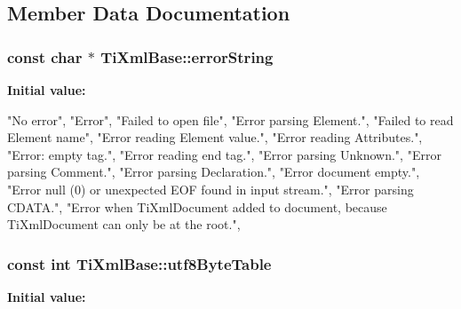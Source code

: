 \subsection{\-Member \-Data \-Documentation}
\hypertarget{class_ti_xml_base_a7ac8feec4100e446b3d78e1ac0659700}{
\subsubsection[{error\-String}]{\setlength{\rightskip}{0pt plus 5cm}const char $\ast$ \-Ti\-Xml\-Base\-::error\-String}}
\label{class_ti_xml_base_a7ac8feec4100e446b3d78e1ac0659700}
{\bfseries \-Initial value\-:}
\begin{DoxyCode}
 {
    "No error",
    "Error",
    "Failed to open file",
    "Error parsing Element.",
    "Failed to read Element name",
    "Error reading Element value.",
    "Error reading Attributes.",
    "Error: empty tag.",
    "Error reading end tag.",
    "Error parsing Unknown.",
    "Error parsing Comment.",
    "Error parsing Declaration.",
    "Error document empty.",
    "Error null (0) or unexpected EOF found in input stream.",
    "Error parsing CDATA.",
    "Error when TiXmlDocument added to document, because TiXmlDocument can only
       be at the root.",
    }
\end{DoxyCode}
\hypertarget{class_ti_xml_base_ac8c86058137bdb4b413c3eca58f2d467}{
\subsubsection[{utf8\-Byte\-Table}]{\setlength{\rightskip}{0pt plus 5cm}const int \-Ti\-Xml\-Base\-::utf8\-Byte\-Table}}
\label{class_ti_xml_base_ac8c86058137bdb4b413c3eca58f2d467}
{\bfseries \-Initial value\-:}
